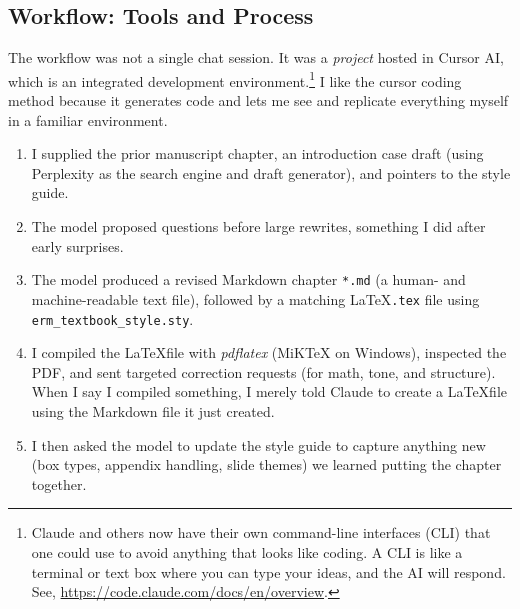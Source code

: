 \documentclass[11pt,letterpaper]{article}
\begin{document}
\subsection{Workflow: Tools and Process}

The workflow was not a single chat session. It was a \emph{project} hosted in Cursor AI, which is an integrated development environment.\footnote{Claude and others now have their own command-line interfaces (CLI) that one could use to avoid anything that looks like coding. A CLI is like a terminal or text box where you can type your ideas, and the AI will respond. See, \url{https://code.claude.com/docs/en/overview}.} I like the cursor coding method because it generates code and lets me see and replicate everything myself in a familiar environment. 

\begin{enumerate}[leftmargin=*, nosep]
  \item I supplied the prior manuscript chapter, an introduction case draft (using Perplexity as the search engine and draft generator), and pointers to the style guide.
  \item The model proposed questions before large rewrites, something I did after early surprises.
  \item The model produced a revised Markdown chapter \texttt{*.md} (a human- and machine-readable text file), followed by a matching \LaTeX \texttt{.tex} file using \texttt{erm\_textbook\_style.sty}.
  \item I compiled the \LaTeX file with \textit{pdflatex} (MiKTeX on Windows), inspected the PDF, and sent targeted correction requests (for math, tone, and structure). When I say I compiled something, I merely told Claude to create a \LaTeX file using the Markdown file it just created. 
  \item I then asked the model to update the style guide to capture anything new (box types, appendix handling, slide themes) we learned putting the chapter together.
\end{enumerate}
\end{document}
